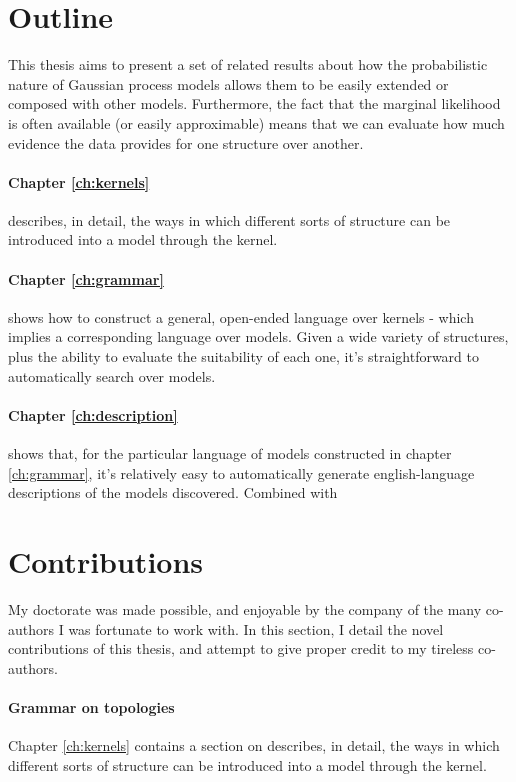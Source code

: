 \section{Outline}

This thesis aims to present a set of related results about how the probabilistic nature of Gaussian process models allows them to be easily extended or composed with other models.
Furthermore, the fact that the marginal likelihood is often available (or easily approximable) means that we can evaluate how much evidence the data provides for one structure over another.


\paragraph{Chapter \ref{ch:kernels}} describes, in detail, the ways in which different sorts of structure can be introduced into a \gp{} model through the kernel.

\paragraph{Chapter \ref{ch:grammar}} shows how to construct a general, open-ended language over kernels - which implies a corresponding language over models.
Given a wide variety of structures, plus the ability to evaluate the suitability of each one, it's straightforward to automatically search over models.

\paragraph{Chapter \ref{ch:description}} shows that, for the particular language of models constructed in chapter \ref{ch:grammar}, it's relatively easy to automatically generate english-language descriptions of the models discovered.
Combined with 


\section{Contributions}

My doctorate was made possible, and enjoyable by the company of the many co-authors I was fortunate to work with.
In this section, I detail the novel contributions of this thesis, and attempt to give proper credit to my tireless co-authors.

\paragraph{Grammar on topologies}
Chapter \ref{ch:kernels} contains a section on describes, in detail, the ways in which different sorts of structure can be introduced into a \gp{} model through the kernel.

